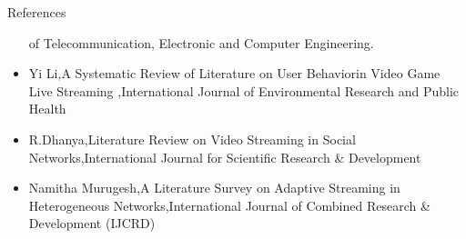 \documentclass{beamer}
\begin{document}
\begin{frame}[t]{References}
\begin{center}
\begin{itemize}
of Telecommunication, Electronic and Computer Engineering.
           
            \item Yi Li,A Systematic Review of Literature on User Behaviorin Video Game Live Streaming ,International Journal of Environmental Research and Public Health
            
           
            \item R.Dhanya,Literature Review on Video Streaming in Social Networks,International Journal for Scientific Research & Development
           
            \item Namitha Murugesh,A Literature Survey on Adaptive Streaming in Heterogeneous Networks,International Journal of Combined Research & Development (IJCRD)
        \end{itemize}
    \end{center}
\end{frame}
\end{document}
